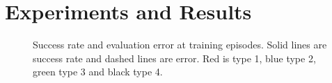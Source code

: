 \section{Experiments and Results}
\begin{figure}
    \caption{Success rate and evaluation error at training episodes. Solid lines are success rate and dashed lines are error. Red is type 1, blue type 2, green type 3 and black type 4.}
    \label{fig:learning-curves}
\end{figure}


